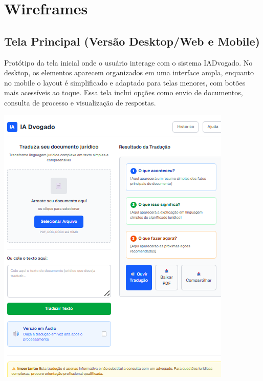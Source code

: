 \documentclass{article}
\begin{document}
\newpage

\section{Wireframes}

\subsection*{Tela Principal (Versão Desktop/Web e Mobile)}
Protótipo da tela inicial onde o usuário interage com o sistema IADvogado. No desktop, os elementos aparecem organizados em uma interface ampla, enquanto no mobile o layout é simplificado e adaptado para telas menores, com botões mais acessíveis ao toque. Essa tela inclui opções como envio de documentos, consulta de processo e visualização de respostas. 

\includegraphics{images/488857524-513c5783-90a3-4785-a3a8-041214390468.png}

\newpage
\end{document}
